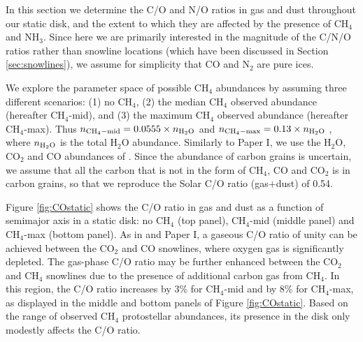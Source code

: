 \documentclass[apj]{emulateapj}
\begin{document}
In this section we determine the C/O and N/O ratios in gas and dust throughout our static disk, and the extent to which they are affected by the presence of CH$_4$ and NH$_3$. Since here we are primarily interested in the magnitude of the C/N/O ratios rather than snowline locations (which have been discussed in Section \ref{sec:snowlines}), we assume for simplicity that CO and N$_2$ are pure ices. 

We explore the parameter space of possible CH$_4$ abundances by assuming three different scenarios: (1) no CH$_4$, (2) the median CH$_4$ observed abundance (hereafter CH$_4$-mid), and (3) the maximum CH$_4$ observed abundance (hereafter CH$_4$-max). Thus $n_{\rm CH_4-mid}=0.0555 \times n_{\rm H_2O}$ \citep{oberg11a} and $n_{\rm CH_4-max}=0.13 \times n_{\rm H_2O}$ \citep{oberg08}, where $n_{\rm H_2O}$ is the total H$_2$O abundance. Similarly to Paper I, we use the H$_2$O, CO$_2$ and CO abundances of \citet{oberg11}. Since the abundance of carbon grains is uncertain, we assume that all the carbon that is not in the form of CH$_4$, CO and CO$_2$ is in carbon grains, so that we reproduce the Solar C/O ratio (gas+dust) of 0.54.  

Figure \ref{fig:COstatic} shows the C/O ratio in gas and dust as a function of semimajor axis in a static disk: no CH$_4$ (top panel), CH$_4$-mid (middle panel) and CH$_4$-max (bottom panel). As in \citet{oberg11} and Paper I, a gaseous C/O ratio of unity can be achieved between the CO$_2$ and CO snowlines, where oxygen gas is significantly depleted. The gas-phase C/O ratio may be further enhanced between the CO$_2$ and CH$_4$ snowlines due to the presence of additional carbon gas from CH$_4$. In this region, the C/O ratio increases by 3\% for CH$_4$-mid and by 8\% for CH$_4$-max, as displayed in the middle and bottom panels of Figure \ref{fig:COstatic}. Based on the range of observed CH$_4$ protostellar abundances, its presence in the disk only modestly affects the C/O ratio. %
\end{document}
